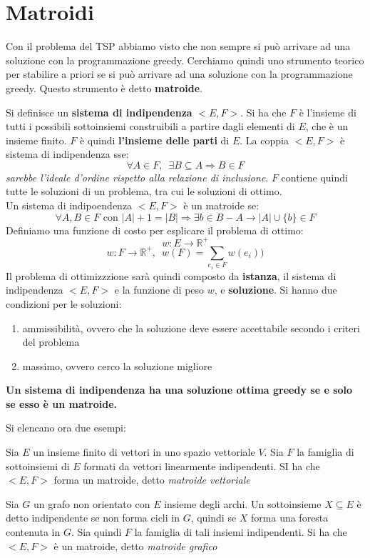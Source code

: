 \documentclass[a4paper,12pt, oneside]{book}
\begin{document}
\section{Matroidi}
Con il problema del TSP abbiamo visto che non sempre si può arrivare
ad una soluzione con la programmazione greedy. Cerchiamo quindi uno
strumento teorico per stabilire a priori se si può arrivare ad una
soluzione con la programmazione greedy. Questo strumento è detto
\textbf{matroide}.
\begin{definizione}
  Si definisce un \textbf{sistema di indipendenza} $<E,F>$. Si ha che
  $F$ è l'insieme di tutti i possibili sottoinsiemi construibili a
  partire dagli elementi di $E$, che è un insieme finito. $F$ è quindi
  \textbf{l'insieme delle parti} di $E$. La coppia $<E,F>$ è sistema
  di indipendenza sse:
  \[\forall A\in F,\,\,\, \exists B\subseteq A\Rightarrow B\in F\]
  \textit{sarebbe l'ideale d’ordine rispetto alla relazione di
    inclusione}. $F$ contiene quindi tutte le soluzioni di un
  problema, tra cui le soluzioni di ottimo.\\
  Un sistema di indipoendenza $<E,F>$ è un matroide se:
  \[\forall A,B\in F\mbox{ con }|A|+1=|B|\Longrightarrow\exists b\in
    B-A\to |A|\cup \{b\}\in F\]
  Definiamo una funzione di costo per esplicare il problema di
  ottimo:
  \[w:E\to \mathbb{R}^+\]
  \[w:F\to \mathbb{R}^+,\,\,\,w(F)=\sum_{e_i\in F}w(e_i))\]
  Il problema di ottimizzzione sarà quindi composto da
  \textbf{istanza}, il sistema di indipendenza $<E,F>$ e la funzione
  di peso $w$, e \textbf{soluzione}. Si hanno due condizioni per le
  soluzioni:
  \begin{enumerate}
    \item ammissibilità, ovvero che la soluzione deve essere
    accettabile secondo i criteri del problema
    \item massimo, ovvero cerco la soluzione migliore
  \end{enumerate}
  \textbf{Un sistema di indipendenza
    ha una soluzione ottima greedy se e solo se esso è un matroide.}
\end{definizione}
Si elencano ora due esempi:
\begin{esempio}
  Sia $E$ un insieme finito di vettori in uno spazio vettoriale
  $V$. Sia $F$ la famiglia di sottoinsiemi di $E$ formati da vettori
  linearmente indipendenti. SI ha che $<E,F>$ forma un matroide, detto
  \textit{matroide vettoriale}
\end{esempio}
\begin{esempio}
  Sia $G$ un grafo non orientato con $E$ insieme degli archi. Un
  sottoinsieme $X\subseteq E$ è detto indipendente se non forma cicli
  in $G$, quindi se $X$ forma una foresta contenuta in $G$. Sia quindi
  $F$ la famiglia di tali insiemi indipendenti. Si ha che $<E,F>$ è un
  matroide, detto \textit{matroide grafico}
\end{esempio}
\end{document}

